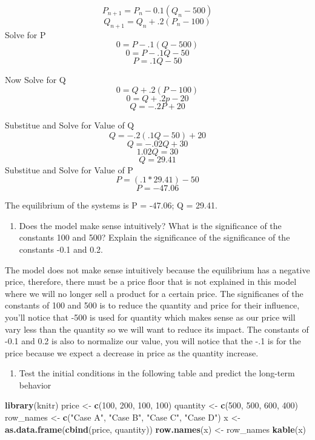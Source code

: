 \documentclass[]{article}
\newenvironment{Shaded}{\begin{snugshade}}{\end{snugshade}}
\newcommand{\KeywordTok}[1]{\textcolor[rgb]{0.13,0.29,0.53}{\textbf{{#1}}}}
\newcommand{\DecValTok}[1]{\textcolor[rgb]{0.00,0.00,0.81}{{#1}}}
\newcommand{\StringTok}[1]{\textcolor[rgb]{0.31,0.60,0.02}{{#1}}}
\newcommand{\NormalTok}[1]{{#1}}
\providecommand{\tightlist}{%
  \setlength{\itemsep}{0pt}\setlength{\parskip}{0pt}}
\begin{document}
\[P_{n+1} = P_n - 0.1(Q_n -500)\] \[Q_{n+1} = Q_n + .2(P_n - 100)\]
Solve for P \[0 = P-.1(Q - 500)\] \[0 = P-.1Q - 50\] \[P = .1Q -50 \]

Now Solve for Q \[0 = Q + .2(P - 100)\] \[0 = Q +.2p-20\]
\[Q = -.2P+20\]

Substitue and Solve for Value of Q \[Q = -.2(.1Q - 50)+20\]
\[Q = -.02Q + 30\] \[1.02Q = 30\] \[Q = 29.41\] Substitue and Solve for
Value of P \[P = (.1*29.41) -50 \] \[P = -47.06\]

The equilibrium of the systems is P = -47.06; Q = 29.41.

\begin{enumerate}
\def\labelenumi{\alph{enumi}.}
\tightlist
\item
  Does the model make sense intuitively? What is the significance of the
  constants 100 and 500? Explain the significance of the significance of
  the constants -0.1 and 0.2.
\end{enumerate}

The model does not make sense intuitively because the equilibrium has a
negative price, therefore, there must be a price floor that is not
explained in this model where we will no longer sell a product for a
certain price. The significanes of the constants of 100 and 500 is to
reduce the quantity and price for their influence, you'll notice that
-500 is used for quantity which makes sense as our price will vary less
than the quantity so we will want to reduce its impact. The constants of
-0.1 and 0.2 is also to normalize our value, you will notice that the
-.1 is for the price because we expect a decrease in price as the
quantity increase.

\begin{enumerate}
\def\labelenumi{\alph{enumi}.}
\setcounter{enumi}{1}
\tightlist
\item
  Test the initial conditions in the following table and predict the
  long-term behavior
\end{enumerate}

\begin{Shaded}
\begin{Highlighting}[]
\KeywordTok{library}\NormalTok{(knitr)}
\NormalTok{price <-}\StringTok{ }\KeywordTok{c}\NormalTok{(}\DecValTok{100}\NormalTok{, }\DecValTok{200}\NormalTok{, }\DecValTok{100}\NormalTok{, }\DecValTok{100}\NormalTok{)}
\NormalTok{quantity <-}\StringTok{ }\KeywordTok{c}\NormalTok{(}\DecValTok{500}\NormalTok{, }\DecValTok{500}\NormalTok{, }\DecValTok{600}\NormalTok{, }\DecValTok{400}\NormalTok{)}
\NormalTok{row_names <-}\StringTok{ }\KeywordTok{c}\NormalTok{(}\StringTok{"Case A"}\NormalTok{, }\StringTok{"Case B"}\NormalTok{, }\StringTok{"Case C"}\NormalTok{, }\StringTok{"Case D"}\NormalTok{)}
\NormalTok{x <-}\StringTok{ }\KeywordTok{as.data.frame}\NormalTok{(}\KeywordTok{cbind}\NormalTok{(price, quantity))}
\KeywordTok{row.names}\NormalTok{(x) <-}\StringTok{ }\NormalTok{row_names}
\KeywordTok{kable}\NormalTok{(x)}
\end{Highlighting}
\end{Shaded}
\end{document}
